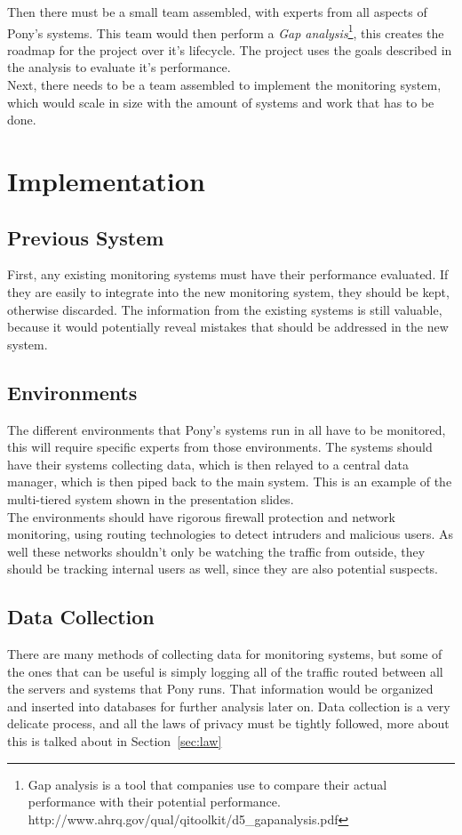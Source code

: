 \documentclass{article}
\numberwithin{equation}{section} %
\numberwithin{figure}{section} %
\numberwithin{table}{section} %
\begin{document}
Then there must be a small team assembled, with experts from all aspects of Pony's systems.  This team would then perform a \textit{Gap analysis}\footnote{Gap analysis is a tool that companies use to compare their actual performance with their potential performance. http://www.ahrq.gov/qual/qitoolkit/d5\_gapanalysis.pdf}, this creates the roadmap for the project over it's lifecycle.  The project uses the goals described in the analysis to evaluate it's performance.\\

Next, there needs to be a team assembled to implement the monitoring system, which would scale in size with the amount of systems and work that has to be done. \\

\section{Implementation}
\subsection{Previous System}
First, any existing monitoring systems must have their performance evaluated.  If they are easily to integrate into the new monitoring system, they should be kept, otherwise discarded.  The information from the existing systems is still valuable, because it would potentially reveal mistakes that should be addressed in the new system.  

\subsection{Environments}
The different environments that Pony's systems run in all have to be monitored, this will require specific experts from those environments.  The systems should have their systems collecting data, which is then relayed to a central data manager, which is then piped back to the main system.  This is an example of the multi-tiered system shown in the presentation slides\cite{slides}.\\

The environments should have rigorous firewall protection and network monitoring, using routing technologies to detect intruders and malicious users.  As well these networks shouldn't only be watching the traffic from outside, they should be tracking internal users as well, since they are also potential suspects.  

\subsection{Data Collection}
There are many methods of collecting data for monitoring systems, but some of the ones that can be useful is simply logging all of the traffic routed between all the servers and systems that Pony runs.  That information would be organized and inserted into databases for further analysis later on.  Data collection is a very delicate process, and all the laws of privacy must be tightly followed, more about this is talked about in Section~\ref{sec:law} 
\end{document}
